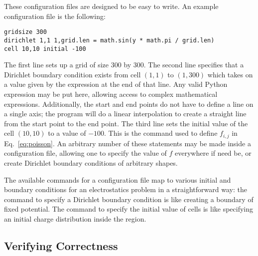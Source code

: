 These configuration files are designed to be easy to write. An example configuration file is the following:
\begin{addmargin}[4em]{2em}
\begin{singlespace}
\texttt{gridsize 300}\\
\texttt{dirichlet 1,1 1,grid.len = math.sin(y * math.pi / grid.len)}\\
\texttt{cell 10,10 initial -100}
\end{singlespace}
\end{addmargin}
The first line sets up a grid of size 300 by 300. The second line specifies that a Dirichlet boundary condition exists
from cell $(1, 1)$ to $(1, 300)$ which takes on a value given by the expression at the end of that line. Any valid Python
expression may be put here, allowing access to complex mathematical expressions. Additionally, the start and end points
do not have to define a line on a single axis; the program will do a linear interpolation to create a straight line from
	the start point to the end point.
The third line sets the initial value of
the cell $(10, 10)$ to a value of $-100$. This is the command used to define $f_{i,j}$ in Eq.~\ref{eq:poisson}.
An arbitrary number of these statements may be made inside a configuration file, allowing one to specify the value of
$f$ everywhere if need be, or create Dirichlet boundary conditions of arbitrary shapes.

The available commands for a configuration file map to various initial and boundary conditions for an electrostatics problem
in a straightforward way: the command to specify a Dirichlet boundary condition is like creating a boundary of fixed potential.
The command to specify the initial value of cells is like specifying an initial charge distribution inside the region.












\subsection{Verifying Correctness}

